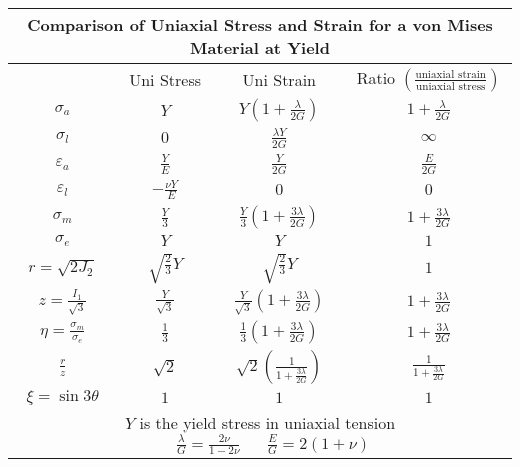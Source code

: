 \renewcommand{\arraystretch}{2.2}

\begin{center}
\begin{tabular}{|c|c|c|c|}
\hline
\multicolumn{4}{|c|}{ {\small Comparison of Uniaxial Stress and Strain for a von Mises Material at Yield} } \\ \hline
                                   & Uni Stress            & Uni Strain                                             & Ratio $\left(\frac{\text{uniaxial strain}}{\text{uniaxial stress}}\right)$ \\ \hline
$\sigma_{a}$                       & $Y$                   & $Y\left(1+\frac{\lambda}{2G}\right)$                   & $1+\frac{\lambda}{2G}$            \\ \hline
$\sigma_{l}$                       & $0$                   & $\frac{\lambda Y}{2G}$                                 & $\infty$                          \\ \hline
$\varepsilon_{a}$                  & $\frac{Y}{E}$         & $\frac{Y}{2G}$                                         & $\frac{E}{2G}$                    \\ \hline
$\varepsilon_{l}$                  & $-\frac{\nu Y}{E}$    & $0$                                                    & $0$                               \\ \hline
$\sigma_m$                         & $\frac{Y}{3}$         & $\frac{Y}{3}\left(1+\frac{3\lambda}{2G}\right)$        & $1+\frac{3\lambda}{2G}$           \\ \hline
$\sigma_e$                         & $Y$                   & $Y$                                                    & $1$                               \\ \hline
$r=\sqrt{2J_2}$                    & $\sqrt{\frac{2}{3}}Y$ & $\sqrt{\frac{2}{3}}Y$                                  & $1$                               \\ \hline
$z = \frac{I_1}{\sqrt{3}}$         & $\frac{Y}{\sqrt{3}}$  & $\frac{Y}{\sqrt{3}}\left(1+\frac{3\lambda}{2G}\right)$ & $1+\frac{3\lambda}{2G}$           \\ \hline
$\eta = \frac{\sigma_m}{\sigma_e}$ & $\frac{1}{3}$         & $\frac{1}{3}\left(1+\frac{3\lambda}{2G}\right)$        & $1+\frac{3\lambda}{2G}$           \\ \hline
$\frac{r}{z}$                      & $\sqrt{2}$            & $\sqrt{2}\left(\frac{1}{1+\frac{3\lambda}{2G}}\right)$ & $\frac{1}{1+\frac{3\lambda}{2G}}$ \\ \hline
$\xi = \sin 3\theta$               & $1$                   & $1$                                                    & $1$                               \\ \hline
\multicolumn{4}{|c|}{ {\small $Y$ is the yield stress in uniaxial tension$\hspace{20pt} \frac{\lambda}{G} = \frac{2\nu}{1-2\nu} \hspace{20pt} \frac{E}{G} = 2(1+\nu)$} } \\ \hline
\end{tabular}
\end{center}

\renewcommand{\arraystretch}{1.0}
